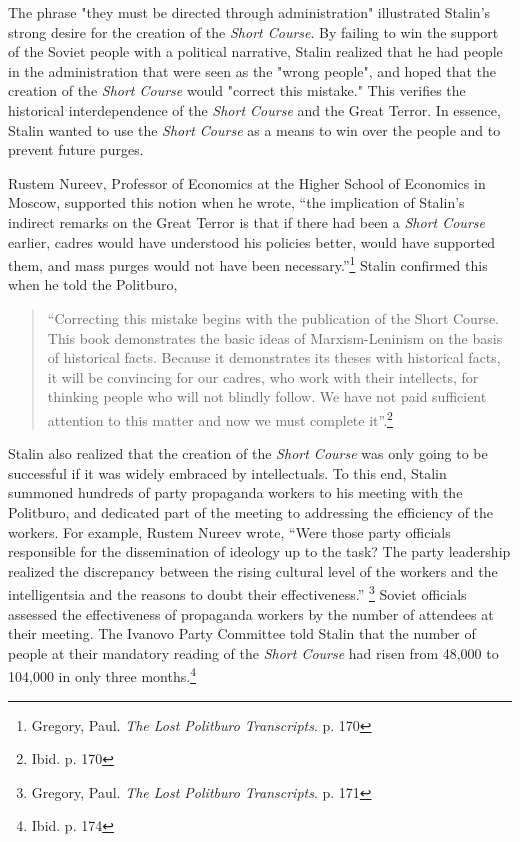 \documentclass[a4paper, twocolumn]{article}
\begin{document}
The phrase "they must be directed through administration" illustrated
Stalin's strong desire for the creation of the \emph{Short Course}. By
failing to win the support of the Soviet people with a political
narrative, Stalin realized that he had people in the administration
that were seen as the "wrong people", and hoped that the creation of
the \emph{Short Course} would "correct this mistake." This verifies the
historical interdependence of the \emph{Short Course} and the Great
Terror. In essence, Stalin wanted to use the \emph{Short Course} as a means
to win over the people and to prevent future purges.

Rustem Nureev, Professor of Economics at the Higher School of
Economics in Moscow, supported this notion when he wrote, ``the
implication of Stalin's indirect remarks on the Great Terror is that
if there had been a \emph{Short Course} earlier, cadres would have understood
his policies better, would have supported them, and mass purges would
not have been necessary.''\footnote{Gregory, Paul. \emph{The Lost Politburo Transcripts}. p. 170} Stalin confirmed this when he told the
Politburo,

\begin{quote}
``Correcting this mistake begins with the publication of the Short
Course. This book demonstrates the basic ideas of Marxism-Leninism on
the basis of historical facts. Because it demonstrates its theses with
historical facts, it will be convincing for our cadres, who work with
their intellects, for thinking people who will not blindly follow. We
have not paid sufficient attention to this matter and now we must
complete it''.\footnote{Ibid. p. 170}
\end{quote}


Stalin also realized that the creation of the \emph{Short Course} was only
going to be successful if it was widely embraced by
intellectuals. To this end, Stalin summoned hundreds of party
propaganda workers to his meeting with the Politburo, and dedicated
part of the meeting to addressing the efficiency of the workers. For
example, Rustem Nureev wrote, ``Were those party officials responsible
for the dissemination of ideology up to the task? The party leadership
realized the discrepancy between the rising cultural level of the
workers and the intelligentsia and the reasons to doubt their
effectiveness.'' \footnote{Gregory, Paul. \emph{The Lost Politburo Transcripts}. p. 171} Soviet officials assessed the effectiveness of
propaganda workers by the number of attendees at their meeting. The
Ivanovo Party Committee told Stalin that the number of people at their mandatory
reading of the \emph{Short Course} had risen from 48,000 to 104,000 in only three months.\footnote{Ibid. p. 174}
\end{document}
